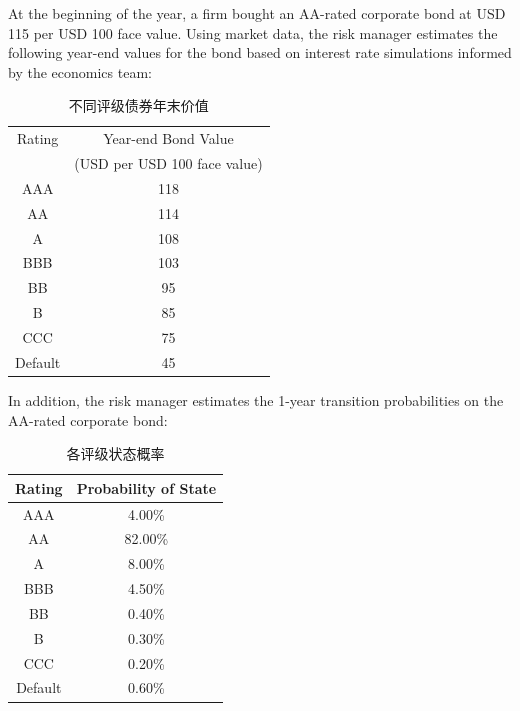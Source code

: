 \documentclass{article}
\newcounter{question} %
\begin{document}
\begin{question}
    At the beginning of the year, a firm bought an AA-rated corporate bond at USD 115 per USD 100 face value. Using market data, the risk manager estimates the following year-end values for the bond based on interest rate simulations informed by the economics team:

    \begin{table}[htbp]
        \centering
        \begin{tabular}{|c|c|}
            \hline
            Rating & Year-end Bond Value \\
            & (USD per USD 100 face value) \\
            \hline
            AAA     & 118 \\
            AA      & 114 \\
            A       & 108 \\
            BBB     & 103 \\
            BB      & 95  \\
            B       & 85  \\
            CCC     & 75  \\
            Default & 45  \\
            \hline
        \end{tabular}
        \caption{不同评级债券年末价值}
    \end{table}

    In addition, the risk manager estimates the 1-year transition probabilities on the AA-rated corporate bond: 
    \begin{table}[htbp]
        \centering
        \begin{tabular}{|c|c|}
            \hline
            Rating & Probability of State \\
            \hline
            AAA     & 4.00\% \\
            AA      & 82.00\% \\
            A       & 8.00\% \\
            BBB     & 4.50\% \\
            BB      & 0.40\% \\
            B       & 0.30\% \\
            CCC     & 0.20\% \\
            Default & 0.60\% \\
            \hline
        \end{tabular}
        \caption{各评级状态概率}
    \end{table}


\end{question}
\end{document}
